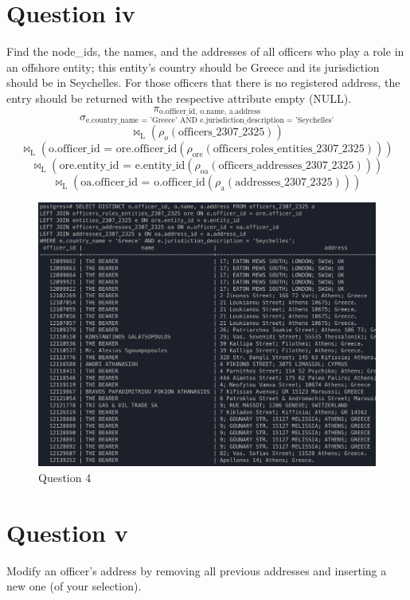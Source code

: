 \documentclass{article}
\begin{document}
\section*{Question iv}
Find the node\_ids, the names, and the addresses of all officers who play a role in an offshore entity; this entity’s country should be Greece and its jurisdiction should be in Seychelles. For those officers that there is no registered address, the entry should be returned with the respective attribute empty (NULL).
\[
    \pi_{\text{o.officer\_id, o.name, a.address}}
\]
\[
    \sigma_{\text{e.country\_name = 'Greece' AND e.jurisdiction\_description = 'Seychelles'}}
\]
\[
    \bowtie_{\text{L}}(\rho_o(\text{{officers\_2307\_2325}}))
\]
\[
    \bowtie_{\text{L}}({\text{o.officer\_id = ore.officer\_id}} (\rho_{\text{ore}}(\text{officers\_roles\_entities\_2307\_2325})))
\]
\[
    \bowtie_{\text{L}}({\text{ore.entity\_id = e.entity\_id}}
    (\rho_{\text{oa}}(\text{officers\_addresses\_2307\_2325})))
\]
\[
    \bowtie_{\text{L}}({\text{oa.officer\_id = o.officer\_id}} (\rho_{\text{a}}(\text{addresses\_2307\_2325})))
\]
\begin{figure}[h]
    \centering
    \includegraphics[width=0.9\linewidth]{Q4.png}
    \captionsetup{labelformat=empty}
    \caption{Question 4}
\end{figure}



\newpage
\section*{Question v}
Modify an officer’s address by removing all previous addresses and inserting a new one (of your selection).
\end{document}
